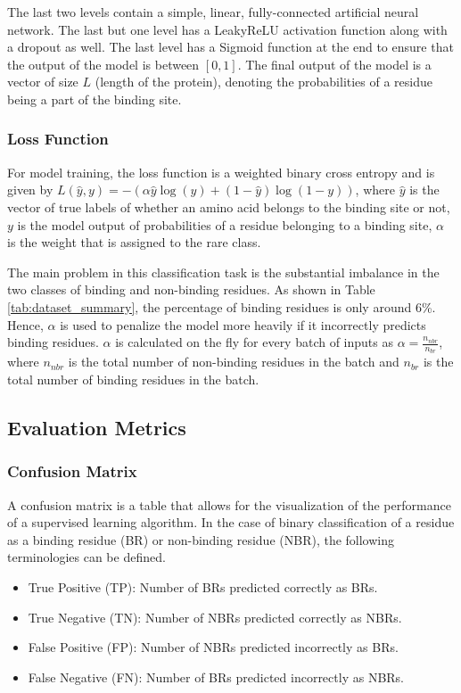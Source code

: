 \documentclass[journal=jacsat,manuscript=article]{achemso}
\begin{document}
The last two levels contain a simple, linear, fully-connected artificial neural network. The last but one level has a LeakyReLU activation function along with a dropout as well. The last level has a Sigmoid function at the end to ensure that the output of the model is between $[0, 1]$. The final output of the model is a vector of size $L$ (length of the protein), denoting the probabilities of a residue being a part of the binding site.

\subsubsection{Loss Function}
\quad For model training, the loss function is a weighted binary cross entropy and is given by
$L(\hat{y}, y) = -(\alpha\hat{y}\log(y) + (1-\hat{y})\log(1-y))$, where $\hat{y}$ is the vector of true labels of whether an amino acid belongs to the binding site or not, $y$ is the model output of probabilities of a residue belonging to a binding site, $\alpha$ is the weight that is assigned to the rare class.

The main problem in this classification task is the substantial imbalance in the two classes of binding and non-binding residues. As shown in Table \ref{tab:dataset_summary}, the percentage of binding residues is only around 6\%. Hence, $\alpha$ is used to penalize the model more heavily if it incorrectly predicts binding residues. $\alpha$ is calculated on the fly for every batch of inputs as $\alpha = \frac{n_{nbr}}{n_{br}}$, where $n_{nbr}$ is the total number of non-binding residues in the batch and $n_{br}$ is the total number of binding residues in the batch.

\subsection{Evaluation Metrics}
\subsubsection{Confusion Matrix}
A confusion matrix is a table that allows for the visualization of the performance of a supervised learning algorithm. In the case of binary classification of a residue as a binding residue (BR) or non-binding residue (NBR), the following terminologies can be defined.
\begin{itemize}
    \item True Positive (TP): Number of BRs predicted correctly as BRs.
    \item True Negative (TN): Number of NBRs predicted correctly as NBRs.
    \item False Positive (FP): Number of NBRs predicted incorrectly as BRs.
    \item False Negative (FN): Number of BRs predicted incorrectly as NBRs.
\end{itemize}
\end{document}
